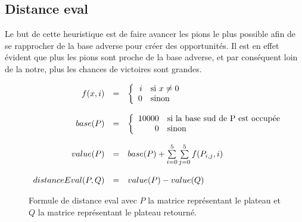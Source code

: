\subsection{Distance eval}

	Le but de cette heuristique est de faire avancer les pions le plus possible afin de se rapprocher de
	la	base adverse pour créer des opportunités. Il est en effet évident que plus les pions sont proche
	de la base adverse, et par conséquent loin de la notre, plus les chances de victoires sont grandes.


	\begin{figure}[h!]
	\[
		\begin{array}{r c l}
			f(x,i) &=&
			\left\{
			\begin{array}{r l}
				i & $si$~ x \neq 0 \\
				0 & $sinon$\\
			\end{array}
			\right. \\

			&& \\

			base(P) &= &
			\left\{
			\begin{array}{r l}
				10000 & $si la base sud de P est occupée$ \\
				0 & $sinon$ \\
			\end{array}
			\right. \\

			&& \\

			value(P) &=&  base(P) + \sum\limits_{i=0}^{5} \sum\limits_{j=0}^{5} f(P_{i,j},i) \\

			&& \\

			distanceEval(P,Q) &=& value(P) - value(Q)\\
		\end{array}
	\]
	\caption[Formule de distance eval]{Formule de distance eval avec $P$ la matrice représentant le
	plateau et $Q$ la matrice représentant le plateau retourné.}
	\label{fig:formula_dist_eval}
	\end{figure}

